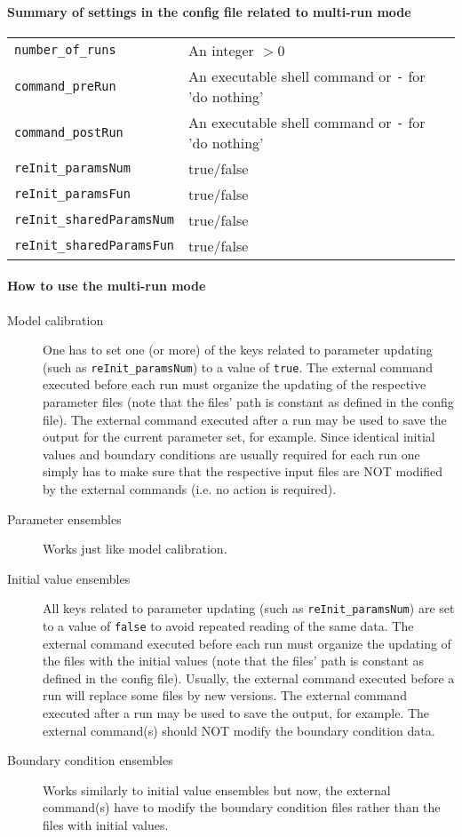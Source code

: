 \documentclass[a4paper,10pt]{article}
\begin{document}
\paragraph{Summary of settings in the config file related to multi-run mode}
\begin{tabular}{ll}
\verb!number_of_runs! &              An integer $>0$ \\
\verb!command_preRun! &              An executable shell command or \verb!-! for 'do nothing' \\
\verb!command_postRun! &             An executable shell command or \verb!-! for 'do nothing' \\
\verb!reInit_paramsNum! &            true/false \\
\verb!reInit_paramsFun! &            true/false \\
\verb!reInit_sharedParamsNum! &      true/false \\
\verb!reInit_sharedParamsFun! &      true/false \\
\end{tabular}

\paragraph{How to use the multi-run mode}
\begin{description}
	\item[Model calibration] One has to set one (or more) of the keys related to parameter updating (such as \verb!reInit_paramsNum!) to a value of \verb!true!. The external command executed before each run must organize the updating of the respective parameter files (note that the files' path is constant as defined in the config file). The external command executed after a run may be used to save the output for the current parameter set, for example. Since identical initial values and boundary conditions are usually required for each run one simply has to make sure that the respective input files are NOT modified by the external commands (i.e. no action is required).
	\item[Parameter ensembles] Works just like model calibration.
	\item[Initial value ensembles] All keys related to parameter updating (such as \verb!reInit_paramsNum!) are set to a value of \verb!false! to avoid repeated reading of the same data. The external command executed before each run must organize the updating of the files with the initial values (note that the files' path is constant as defined in the config file). Usually, the external command executed before a run will replace some files by new versions. The external command executed after a run may be used to save the output, for example. The external command(s) should NOT modify the boundary condition data.
	\item[Boundary condition ensembles] Works similarly to initial value ensembles but now, the external command(s) have to modify the boundary condition files rather than the files with initial values.
\end{description}
\end{document}

